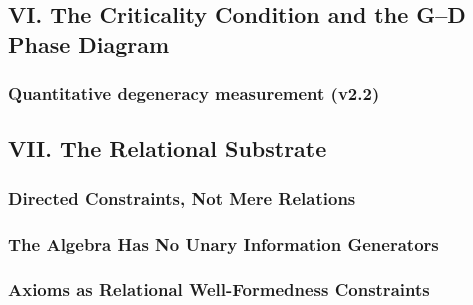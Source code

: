 \documentclass{article[11pt,letterpaper]}
\begin{document}

\subsection{VI. The Criticality Condition and the G–D Phase Diagram}
\label{sec:vi-the-criticality-condition-and-the-gd-phase-diag}


\subsubsection{Quantitative degeneracy measurement (v2.2)}
\label{sec:quantitative-degeneracy-measurement-v22}


\subsection{VII. The Relational Substrate}
\label{sec:vii-the-relational-substrate}


\subsubsection{Directed Constraints, Not Mere Relations}
\label{sec:directed-constraints-not-mere-relations}


\subsubsection{The Algebra Has No Unary Information Generators}
\label{sec:the-algebra-has-no-unary-information-generators}


\subsubsection{Axioms as Relational Well-Formedness Constraints}
\label{sec:axioms-as-relational-well-formedness-constraints}

\end{document}
